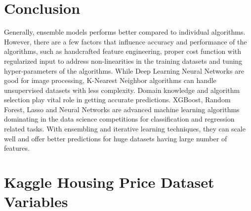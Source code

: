 \documentclass[sigconf]{acmart}
\begin{document}
	
	\section{Conclusion}
	
	Generally, ensemble models performs better compared to individual algorithms. However, there are a few factors that influence accuracy and performance of the algorithms, such as handcrafted feature engineering, proper cost function with regularized input to address non-linearities in the training datasets and tuning hyper-parameters of the algorithms. While Deep Learning Neural Networks are good for image processing, K-Nearest Neighbor algorithms can handle unsupervised datasets with less complexity. Domain knowledge and algorithm selection play vital role in getting accurate predictions. XGBoost, Random Forest, Lasso and Neural Networks are advanced machine learning algorithms dominating in the data science competitions for classification and regression related tasks. With ensembling and iterative learning techniques, they can scale well and offer better predictions for huge datasets having large number of features. 
	
	\appendix
	
	\section{Kaggle Housing Price Dataset Variables}
	
\end{document}

